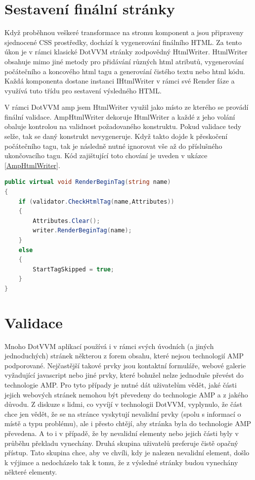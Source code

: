 \section{Sestavení finální stránky}
Když proběhnou veškeré transformace na stromu komponent a jsou připraveny sjednocené CSS prostředky, dochází k vygenerování finálního HTML. Za tento úkon je v rámci klasické DotVVM stránky zodpovědný HtmlWriter. HtmlWriter obsahuje mimo jiné metody pro přidávání různých html atributů, vygenerování počátečního a koncového html tagu a generování čistého textu nebo html kódu. Každá komponenta dostane instanci IHtmlWriter v rámci své Render fáze a využívá tuto třídu pro sestavení výsledného HTML.

V rámci DotVVM amp jsem HtmlWriter využil jako místo ze kterého se provádí finální validace. AmpHtmlWriter dekoruje HtmlWriter a každé z jeho volání obaluje kontrolou na validnost požadovaného konstruktu. Pokud validace tedy selže, tak se daný konstrukt nevygeneruje. Když takto dojde k přeskočení počátečního tagu, tak je následně nutné ignorovat vše až do příslušného ukončovacího tagu. Kód zajištující toto chování je uveden v ukázce \ref{AmpHtmlWriter}.


\begin{lstlisting}[language=c#, caption=Metoda RenderBeginTag na třídě AmpHtmlWriter ,label=AmpHtmlWriter,captionpos=t]
public virtual void RenderBeginTag(string name)
{
    if (validator.CheckHtmlTag(name,Attributes))
    {
        Attributes.Clear();
        writer.RenderBeginTag(name);
    }
    else
    {
        StartTagSkipped = true;
    }
}
\end{lstlisting}

\section{Validace}
Mnoho DotVVM aplikací používá i v rámci svých úvodních (a jiných jednoduchých) stránek některou z forem obsahu, které nejsou technologií AMP podporované. Nejčastější takové prvky jsou kontaktní formuláře, webové galerie vyžadující javascript nebo jiné prvky, které bohužel nelze jednoduše převést do technologie AMP.
Pro tyto případy je nutné dát uživatelům vědět, jaké části jejich webových stránek nemohou být převedeny do technologie AMP a z jakého důvodu. Z diskuze s lidmi, co vyvíjí v technologii DotVVM, vyplynulo, že část chce jen vědět, že se na stránce vyskytují nevalidní prvky (spolu s informací o místě a typu problému), ale i přesto chtějí, aby stránka byla do technologie AMP převedena. A to i v případě, že by nevalidní elementy nebo jejich části byly v průběhu překladu vynechány. Druhá skupina uživatelů preferuje čistě opačný přístup. Tato skupina chce, aby ve chvíli, kdy je nalezen nevalidní element, došlo k výjimce a nedocházelo tak k tomu, že z výsledné stránky budou vynechány některé elementy.


